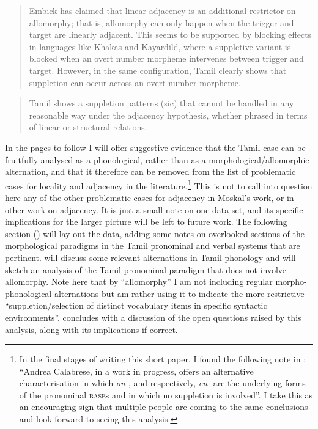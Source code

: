 \documentclass[output=paper]{langscibook}
\begin{document}
\begin{quote}
Embick has claimed that linear adjacency is an additional restrictor on allomorphy; that is, allomorphy can only happen when the trigger and target are linearly adjacent. This seems to be supported by blocking effects in languages like Khakas and Kayardild, where a suppletive variant is blocked when an overt number morpheme intervenes between trigger and target. However, in the same configuration, Tamil clearly shows that suppletion can occur across an overt number morpheme.\hfill\hbox{\citep[107]{Moskal2015}}
\end{quote}
\begin{quote}
Tamil shows a suppletion patterns (sic) that cannot be handled in any reasonable way under the adjacency hypothesis, whether phrased in terms of linear or structural relations.\hfill\hbox{\citep[91]{Moskal2015}}
\end{quote}

In the pages to follow I will offer suggestive evidence that the Tamil case can be fruitfully analysed as a phonological, rather than as a morphological/allomorphic alternation, and that it therefore can be removed from the list of problematic cases for locality and adjacency in the literature.\footnote{In the final stages of writing this short paper, I found the following note in \citet[1054]{SmithBobaljik2019}: “Andrea Calabrese, in a work in progress, offers an alternative characterisation in which \textit{on-}, and respectively, \textit{en-} are the underlying forms of the pronominal \textsc{base}s and in which no suppletion is involved”. I take this as an encouraging sign that multiple people are coming to the same conclusions and look forward to seeing this analysis.}  This is not to call into question here any of the other problematic cases for adjacency in Moskal’s work, or in other work on adjacency. It is just a small note on one data set, and its specific implications for the larger picture will be left to future work. The following section () will lay out the data, adding some notes on overlooked sections of the morphological paradigms in the Tamil pronominal and verbal systems that are pertinent.  will discuss some relevant alternations in Tamil phonology and will sketch an analysis of the Tamil pronominal paradigm that does not involve allomorphy. Note here that by “allomorphy” I am not including regular morpho-phonological alternations but am rather using it to indicate the more restrictive “suppletion/selection of distinct vocabulary items in specific syntactic environments”.  concludes with a discussion of the open questions raised by this analysis, along with its implications if correct.
\end{document}
